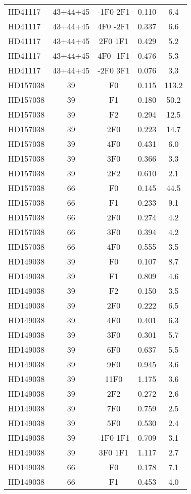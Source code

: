 \begin{table*}
\begin{tabular}{l c c c c}
HD41117 & 43+44+45 & -1F0 2F1 & 0.110 & 6.4\\ 
HD41117 & 43+44+45 & 4F0 -2F1 & 0.337 & 6.6\\ 
HD41117 & 43+44+45 & 2F0 1F1 & 0.429 & 5.2\\ 
HD41117 & 43+44+45 & 4F0 -1F1 & 0.476 & 5.3\\ 
HD41117 & 43+44+45 & -2F0 3F1 & 0.076 & 3.3\\ 
\hline
HD157038 & 39 & F0 & 0.115 & 113.2\\ 
HD157038 & 39 & F1 & 0.180 & 50.2\\ 
HD157038 & 39 & F2 & 0.294 & 12.5\\ 
HD157038 & 39 & 2F0 & 0.223 & 14.7\\ 
HD157038 & 39 & 4F0 & 0.431 & 6.0\\ 
HD157038 & 39 & 3F0 & 0.366 & 3.3\\ 
HD157038 & 39 & 2F2 & 0.610 & 2.1\\ 
\hline
HD157038 & 66 & F0 & 0.145 & 44.5\\ 
HD157038 & 66 & F1 & 0.233 & 9.1\\ 
HD157038 & 66 & 2F0 & 0.274 & 4.2\\ 
HD157038 & 66 & 3F0 & 0.394 & 4.2\\ 
HD157038 & 66 & 4F0 & 0.555 & 3.5\\ 
\hline
HD149038 & 39 & F0 & 0.107 & 8.7\\ 
HD149038 & 39 & F1 & 0.809 & 4.6\\ 
HD149038 & 39 & F2 & 0.150 & 3.5\\ 
HD149038 & 39 & 2F0 & 0.222 & 6.5\\ 
HD149038 & 39 & 4F0 & 0.401 & 6.3\\ 
HD149038 & 39 & 3F0 & 0.301 & 5.7\\ 
HD149038 & 39 & 6F0 & 0.637 & 5.5\\ 
HD149038 & 39 & 9F0 & 0.945 & 3.6\\ 
HD149038 & 39 & 11F0 & 1.175 & 3.6\\ 
HD149038 & 39 & 2F2 & 0.272 & 2.6\\ 
HD149038 & 39 & 7F0 & 0.759 & 2.5\\ 
HD149038 & 39 & 5F0 & 0.530 & 2.4\\ 
HD149038 & 39 & -1F0 1F1 & 0.709 & 3.1\\ 
HD149038 & 39 & 3F0 1F1 & 1.117 & 2.7\\ 
\hline
HD149038 & 66 & F0 & 0.178 & 7.1\\ 
HD149038 & 66 & F1 & 0.453 & 4.0\\ 

\end{tabular}
\end{table*}
